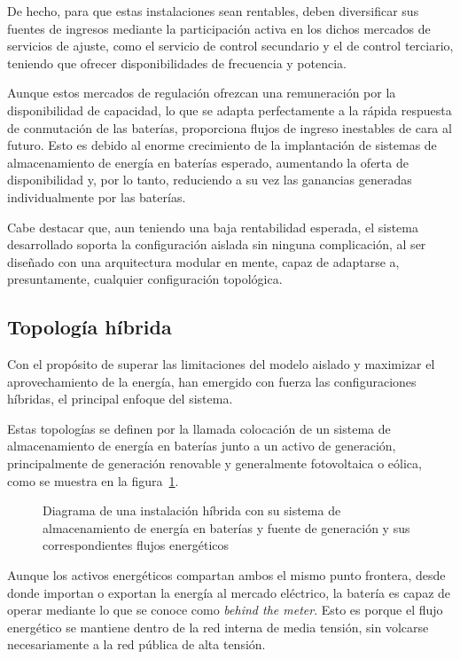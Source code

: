 De hecho, para que estas instalaciones sean rentables, deben diversificar sus fuentes de ingresos mediante la participación activa en los dichos mercados de servicios de ajuste, como el servicio de control secundario y el de control terciario, teniendo que ofrecer disponibilidades de frecuencia y potencia.

Aunque estos mercados de regulación ofrezcan una remuneración por la disponibilidad de capacidad, lo que se adapta perfectamente a la rápida respuesta de conmutación de las baterías, proporciona flujos de ingreso inestables de cara al futuro. Esto es debido al enorme crecimiento de la implantación de sistemas de almacenamiento de energía en baterías esperado, aumentando la oferta de disponibilidad y, por lo tanto, reduciendo a su vez las ganancias generadas individualmente por las baterías.

Cabe destacar que, aun teniendo una baja rentabilidad esperada, el sistema desarrollado soporta la configuración aislada sin ninguna complicación, al ser diseñado con una arquitectura modular en mente, capaz de adaptarse a, presuntamente, cualquier configuración topológica.

\subsection{Topología híbrida}
\label{makereference3.1.2}

Con el propósito de superar las limitaciones del modelo aislado y maximizar el aprovechamiento de la energía, han emergido con fuerza las configuraciones híbridas, el principal enfoque del sistema.

Estas topologías se definen por la llamada colocación de un sistema de almacenamiento de energía en baterías junto a un activo de generación, principalmente de generación renovable y generalmente fotovoltaica o eólica, como se muestra en la figura~\ref{fig:topologia-híbrida}.

\begin{figure}
  \centering
  \caption{Diagrama de una instalación híbrida con su sistema de almacenamiento de energía en baterías y fuente de generación y sus correspondientes flujos energéticos}
  \label{fig:topologia-híbrida}
\end{figure}

Aunque los activos energéticos compartan ambos el mismo punto frontera, desde donde importan o exportan la energía al mercado eléctrico, la batería es capaz de operar mediante lo que se conoce como \textit{behind the meter}. Esto es porque el flujo energético se mantiene dentro de la red interna de media tensión, sin volcarse necesariamente a la red pública de alta tensión.

